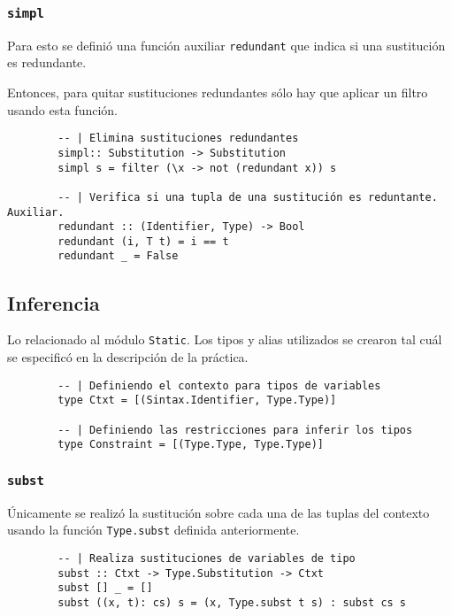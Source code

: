 \documentclass{article}
\begin{document}
    \subsubsection{\texttt{simpl}}

    Para esto se definió una función auxiliar \texttt{redundant} que indica si
    una sustitución es redundante.

    Entonces, para quitar sustituciones redundantes sólo hay que aplicar un
    filtro usando esta función.

    \begin{verbatim}
        -- | Elimina sustituciones redundantes
        simpl:: Substitution -> Substitution
        simpl s = filter (\x -> not (redundant x)) s
      
        -- | Verifica si una tupla de una sustitución es reduntante. Auxiliar.
        redundant :: (Identifier, Type) -> Bool
        redundant (i, T t) = i == t
        redundant _ = False
    \end{verbatim}

    \subsection{Inferencia}
    
    Lo relacionado al módulo \texttt{Static}. Los tipos y alias utilizados se
    crearon tal cuál se especificó en la descripción de la práctica.

    \begin{verbatim}
        -- | Definiendo el contexto para tipos de variables
        type Ctxt = [(Sintax.Identifier, Type.Type)] 

        -- | Definiendo las restricciones para inferir los tipos
        type Constraint = [(Type.Type, Type.Type)]
    \end{verbatim}

    \subsubsection{\texttt{subst}}

    Únicamente se realizó la sustitución sobre cada una de las tuplas del
    contexto usando la función \texttt{Type.subst} definida anteriormente.

    \begin{verbatim}
        -- | Realiza sustituciones de variables de tipo
        subst :: Ctxt -> Type.Substitution -> Ctxt
        subst [] _ = []
        subst ((x, t): cs) s = (x, Type.subst t s) : subst cs s
    \end{verbatim}
\end{document}

